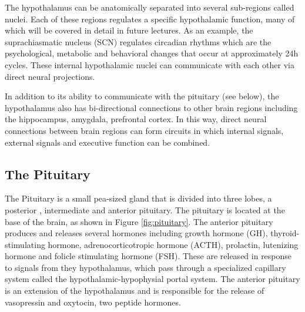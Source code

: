 \documentclass{tufte-handout}
\begin{document}
  The hypothalamus can be anatomically separated into several sub-regions called nuclei.  Each of these regions regulates a specific hypothalamic function, many of which will be covered in detail in future lectures.  As an example, the suprachiasmatic nucleus (SCN) regulates circadian rhythms which are the psychological, metabolic and behavioral changes that occur at approximately 24h cycles.  These internal hypothalamic nuclei can communicate with each other via direct neural projections.

  In addition to its ability to communicate with the pituitary (see below), the hypothalamus also has bi-directional connections to other brain regions including the hippocampus, amygdala, prefrontal cortex.  In this way, direct neural connections between brain regions can form circuits in which internal signals, external signals and executive function can be combined.

\subsection{The Pituitary}

The Pituitary is a small pea-sized gland that is divided into three lobes, a posterior , intermediate and anterior pituitary.  The pituitary is located at the base of the brain, as shown in Figure \ref{fig:pituitary}.  The anterior pituitary produces and releases several hormones including growth hormone (GH), thyroid-stimulating hormone, adrenocorticotropic hormone (ACTH), prolactin, lutenizing hormone and folicle stimulating hormone (FSH).  These are released in response to signals from they hypothalamus, which pass through a specialized capillary system called the hypothalamic-hypophysial portal system.  The anterior pituitary is an extension of the hypothalamus and is responsible for the release of vasopressin and oxytocin, two peptide hormones. 
\end{document}
